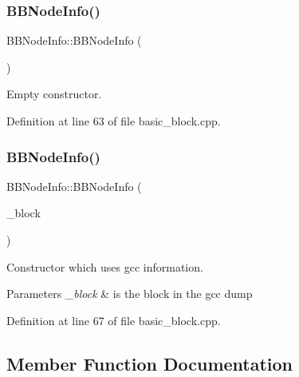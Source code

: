 \subsubsection{\texorpdfstring{B\+B\+Node\+Info()}{BBNodeInfo()}\hspace{0.1cm}{\footnotesize\ttfamily [1/2]}}
{\footnotesize\ttfamily B\+B\+Node\+Info\+::\+B\+B\+Node\+Info (\begin{DoxyParamCaption}{ }\end{DoxyParamCaption})}



Empty constructor. 



Definition at line 63 of file basic\+\_\+block.\+cpp.

\mbox{\label{structBBNodeInfo_a68cd849a452fa046ebe832ae6682dc74}} 
\subsubsection{\texorpdfstring{B\+B\+Node\+Info()}{BBNodeInfo()}\hspace{0.1cm}{\footnotesize\ttfamily [2/2]}}
{\footnotesize\ttfamily B\+B\+Node\+Info\+::\+B\+B\+Node\+Info (\begin{DoxyParamCaption}\item[{bloc\+Ref}]{\+\_\+block }\end{DoxyParamCaption})\hspace{0.3cm}{\ttfamily [explicit]}}



Constructor which uses gcc information. 


\begin{DoxyParams}{Parameters}
{\em \+\_\+block} & is the block in the gcc dump \\
\hline
\end{DoxyParams}


Definition at line 67 of file basic\+\_\+block.\+cpp.



\subsection{Member Function Documentation}
\mbox{\label{structBBNodeInfo_a837355045673c67780f13ebb70eca2c0}} 
